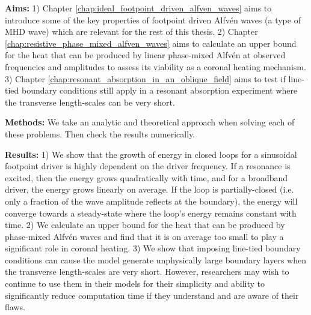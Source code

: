\begin{spacing}{1.1}
\textbf{Aims:}
1) Chapter \ref{chap:ideal_footpoint_driven_alfven_waves} aims to introduce some of the key properties of footpoint driven Alfv\'en waves (a type of MHD wave) which are relevant for the rest of this thesis.
2) Chapter \ref{chap:resistive_phase_mixed_alfven_waves} aims to calculate an upper bound for the heat that can be produced by linear phase-mixed Alfv\'en at observed frequencies and amplitudes to assess its viability as a coronal heating mechanism.
3) Chapter \ref{chap:resonant_absorption_in_an_oblique_field} aims to test if line-tied boundary conditions still apply in a resonant absorption experiment where the transverse length-scales can be very short.

\textbf{Methods:} We take an analytic and theoretical approach when solving each of these problems. Then check the results numerically.

\textbf{Results:} 1) We show that the growth of energy in closed loops for a sinusoidal footpoint driver is highly dependent on the driver frequency. If a resonance is excited, then the energy grows quadratically with time, and for a broadband driver, the energy grows linearly on average. If the loop is partially-closed (i.e. only a fraction of the wave amplitude reflects at the boundary), the energy will converge towards a steady-state where the loop's energy remains constant with time. 
2) We calculate an upper bound for the heat that can be produced by phase-mixed Alfv\'en waves and find that it is on average too small to play a significant role in coronal heating. 
3) We show that imposing line-tied boundary conditions can cause the model generate unphysically large boundary layers when the transverse length-scales are very short. However, researchers may wish to continue to use them in their models for their simplicity and ability to significantly reduce computation time if they understand and are aware of their flaws.

\end{spacing}